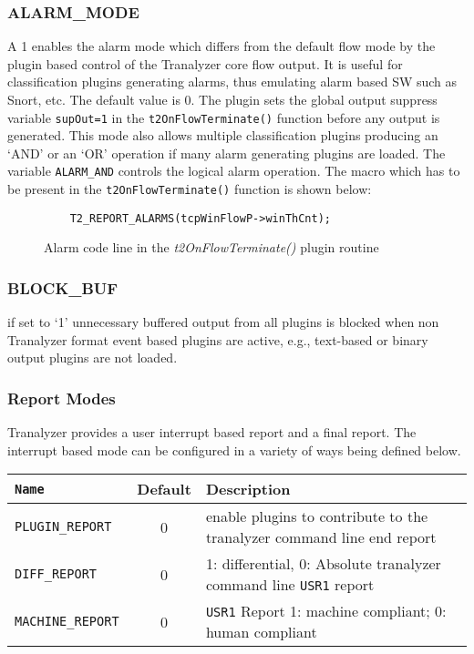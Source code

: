 \subsubsection{ALARM\_MODE}
A 1 enables the alarm mode which differs from the default flow mode by the plugin based control of the Tranalyzer core flow output. It is useful for
classification plugins generating alarms, thus emulating alarm based SW such as Snort, etc. The default value is 0.
The plugin sets the global output suppress variable {\tt supOut=1} in the {\tt t2OnFlowTerminate()} function before any output is generated. This mode also allows multiple classification plugins producing an `AND' or an `OR' operation if many alarm generating plugins are loaded. The variable {\tt ALARM\_AND} controls the logical alarm operation. The macro which has to be present in the {\tt t2OnFlowTerminate()} function is shown below:

\begin{figure}[ht]
\centering
\begin{lstlisting}
    T2_REPORT_ALARMS(tcpWinFlowP->winThCnt);
\end{lstlisting}
\caption{Alarm code line in the {\em t2OnFlowTerminate()} plugin routine}
\end{figure}

\subsubsection{BLOCK\_BUF}
if set to `1' unnecessary buffered output from all plugins is blocked when non Tranalyzer format event based plugins are active, e.g., text-based or binary output plugins are not loaded.

\clearpage

\subsubsection{Report Modes}
Tranalyzer provides a user interrupt based report and a final report. The interrupt based mode can be configured in a variety of ways being defined below.

\begin{longtable}{>{\tt}lcl}
    \toprule
    {\bf Name} & {\bf Default} & {\bf Description}\\
    \midrule\endhead%
    PLUGIN\_REPORT  & 0 & enable plugins to contribute to the tranalyzer command line end report \\
    DIFF\_REPORT    & 0 & 1: differential, 0: Absolute tranalyzer command line {\tt USR1} report \\
    MACHINE\_REPORT & 0 & {\tt USR1} Report 1: machine compliant; 0: human compliant \\
    \bottomrule
\end{longtable}


